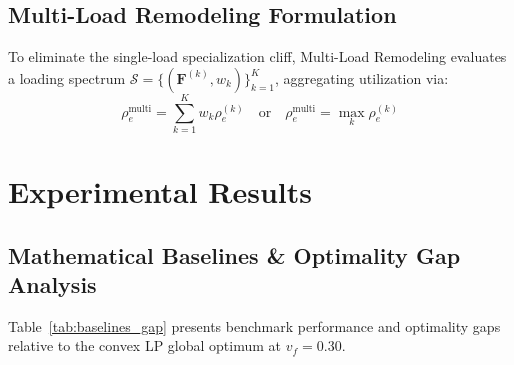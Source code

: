 \documentclass[10pt,journal,compsoc]{IEEEtran}
\begin{document}
\subsection{Multi-Load Remodeling Formulation}
To eliminate the single-load specialization cliff, Multi-Load Remodeling evaluates a loading spectrum $\mathcal{S} = \{ (\mathbf{F}^{(k)}, w_k) \}_{k=1}^K$, aggregating utilization via:
\begin{equation}
\rho_e^{\text{multi}} = \sum_{k=1}^K w_k \rho_e^{(k)} \quad \text{or} \quad \rho_e^{\text{multi}} = \max_k \rho_e^{(k)}
\end{equation}

\section{Experimental Results}

\subsection{Mathematical Baselines \& Optimality Gap Analysis}
Table~\ref{tab:baselines_gap} presents benchmark performance and optimality gaps relative to the convex LP global optimum at $v_f = 0.30$.
\end{document}
